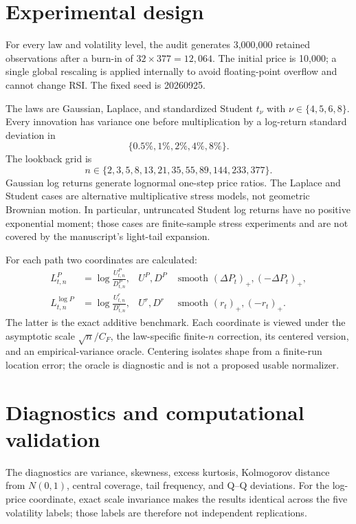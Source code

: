\documentclass[10pt]{article}
\begin{document}
\section{Experimental design}

For every law and volatility level, the audit generates 3,000,000 retained observations after a burn-in of $32\times377=12{,}064$. The initial price is 10,000; a single global rescaling is applied internally to avoid floating-point overflow and cannot change RSI. The fixed seed is 20260925.

The laws are Gaussian, Laplace, and standardized Student $t_\nu$ with $\nu\in\{4,5,6,8\}$. Every innovation has variance one before multiplication by a log-return standard deviation in
\begin{equation}\{0.5\%,1\%,2\%,4\%,8\%\}.\end{equation}
The lookback grid is
\begin{equation}n\in\{2,3,5,8,13,21,35,55,89,144,233,377\}.\end{equation}
Gaussian log returns generate lognormal one-step price ratios. The Laplace and Student cases are alternative multiplicative stress models, not geometric Brownian motion. In particular, untruncated Student log returns have no positive exponential moment; those cases are finite-sample stress experiments and are not covered by the manuscript's light-tail expansion.

For each path two coordinates are calculated:
\begin{align}
L^P_{t,n}&=\log\frac{U^P_{t,n}}{D^P_{t,n}}, & U^P,D^P&\text{ smooth }(\Delta P_t)_+,(-\Delta P_t)_+,\\
L^{\log P}_{t,n}&=\log\frac{U^r_{t,n}}{D^r_{t,n}}, & U^r,D^r&\text{ smooth }(r_t)_+,(-r_t)_+.
\end{align}
The latter is the exact additive benchmark. Each coordinate is viewed under the asymptotic scale $\sqrt n/C_F$, the law-specific finite-$n$ correction, its centered version, and an empirical-variance oracle. Centering isolates shape from a finite-run location error; the oracle is diagnostic and is not a proposed usable normalizer.

\section{Diagnostics and computational validation}

The diagnostics are variance, skewness, excess kurtosis, Kolmogorov distance
from $N(0,1)$, central coverage, tail frequency, and Q--Q deviations.  For the
log-price coordinate, exact scale invariance makes the results identical across
the five volatility labels; those labels are therefore not independent
replications.
\end{document}
